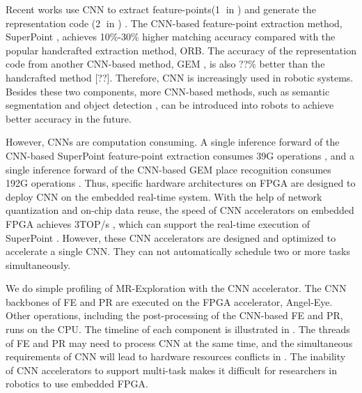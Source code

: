 Recent works use CNN to extract feature-points(\textcircled{1} in ) \cite{detone2018superpoint, simo2015discriminative, yi2016lift} and generate the representation code (\textcircled{2} in ) \cite{arandjelovic2016netvlad, radenovic2018fine}. 
The CNN-based feature-point extraction method, SuperPoint \cite{detone2018superpoint}, achieves 10\%-30\% higher matching accuracy compared with the popular handcrafted extraction method, ORB\cite{Mur-Artal:2017281}.
The accuracy of the representation code from another CNN-based method, GEM \cite{radenovic2018fine}, is also ??\% better than the handcrafted method [??].
Therefore, CNN is increasingly used in robotic systems. 
Besides these two components, more CNN-based methods, such as semantic segmentation \cite{long2015fully} and object detection \cite{ren2015faster}, can be introduced into robots to achieve better accuracy in the future.

However, CNNs are computation consuming. A single inference forward of the CNN-based SuperPoint \cite{detone2018superpoint} feature-point extraction consumes 39G operations \cite{detone2018superpoint}, and a single inference forward of the CNN-based GEM \cite{radenovic2018fine} place recognition consumes 192G operations \cite{radenovic2018fine}.
Thus, specific hardware architectures on FPGA \cite{guo2017angel,yu2018instruction,li_high_2016,qiu2016going,lu_evaluating_2017} are designed to deploy CNN on the embedded real-time system.
With the help of network quantization and on-chip data reuse, the speed of CNN accelerators on embedded FPGA achieves 3TOP/s \cite{lu_evaluating_2017}, which can support the real-time execution of SuperPoint \cite{detone2018superpoint}.
However, these CNN accelerators are designed and optimized to accelerate a single CNN. They can not automatically schedule two or more tasks simultaneously. 





We do simple profiling of MR-Exploration with the CNN accelerator. The CNN backbones of FE and  PR are executed on the FPGA accelerator, Angel-Eye\cite{guo2017angel}.
Other operations, including the post-processing of the CNN-based FE and PR, runs on the CPU. The timeline of each component is illustrated in . 
The threads of FE and PR may need to process CNN at the same time,  and the simultaneous requirements of CNN will lead to hardware resources conflicts in . The inability of CNN accelerators to support multi-task makes it difficult for researchers in robotics to use embedded FPGA.

